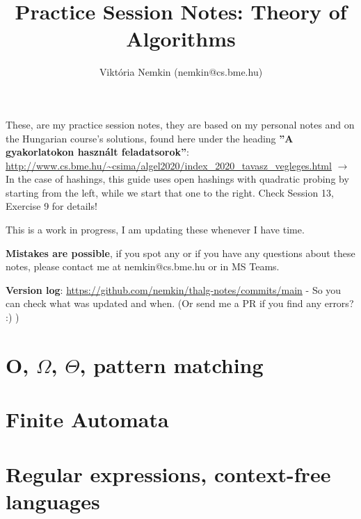 \documentclass[a4paper]{article}
\author{Viktória Nemkin (nemkin@cs.bme.hu)}
\title{Practice Session Notes: Theory of Algorithms}
\newcommand{\titlemath}[1]{\texorpdfstring{#1}{Lg}}
\begin{document}
\maketitle

These, are my practice session notes, they are based on my personal notes and on the Hungarian course's solutions, found here under the heading \textbf{''A gyakorlatokon használt feladatsorok''}:\\ \url{http://www.cs.bme.hu/~csima/algel2020/index_2020_tavasz_vegleges.html} $\rightarrow$ In the case of hashings, this guide uses open hashings with quadratic probing by starting from the left, while we start that one to the right. Check Session 13, Exercise 9 for details!

This is a work in progress, I am updating these whenever I have time.

\textbf{Mistakes are possible}, if you spot any or if you have any questions about these notes, please contact me at nemkin@cs.bme.hu or in MS Teams.

\textbf{Version log}: \href{https://github.com/nemkin/thalg-notes/commits/main}{https://github.com/nemkin/thalg-notes/commits/main} - So you can check what was updated and when. (Or send me a PR if you find any errors? :) )

\tableofcontents
\pagebreak

\section{O, \titlemath{$\Omega$, $\Theta$}, pattern matching}
\pagebreak
\pagebreak
\pagebreak
\pagebreak
\pagebreak
\pagebreak
\pagebreak
\pagebreak
\pagebreak
\pagebreak
\pagebreak
\pagebreak

\section{Finite Automata}
\pagebreak
\pagebreak
\pagebreak
\pagebreak
\pagebreak
\pagebreak
\pagebreak
\pagebreak
\pagebreak
\pagebreak
\pagebreak
\pagebreak
\pagebreak

\section{Regular expressions, context-free languages}
\pagebreak
\pagebreak
\pagebreak
\pagebreak
\pagebreak
\pagebreak
\pagebreak
\pagebreak
\pagebreak
\pagebreak
\pagebreak
\pagebreak
\end{document}

